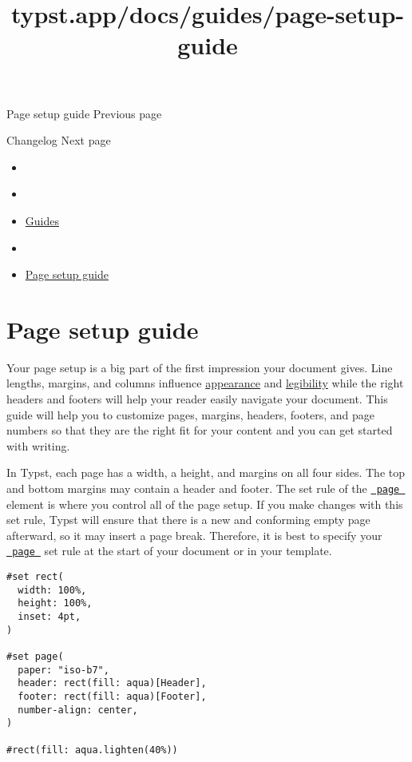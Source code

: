{ Page setup guide } { Previous page }

\href{/docs/changelog/}{\pandocbounded{}}

{ Changelog } { Next page }


\title{typst.app/docs/guides/page-setup-guide}

\begin{itemize}
\tightlist
\item
  \href{/docs}{}
\item
  
\item
  \href{/docs/guides/}{Guides}
\item
  
\item
  \href{/docs/guides/page-setup-guide/}{Page setup guide}
\end{itemize}

\section{Page setup guide}\label{page-setup-guide}

Your page setup is a big part of the first impression your document
gives. Line lengths, margins, and columns influence
\href{https://practicaltypography.com/page-margins.html}{appearance} and
\href{https://designregression.com/article/line-length-revisited-following-the-research}{legibility}
while the right headers and footers will help your reader easily
navigate your document. This guide will help you to customize pages,
margins, headers, footers, and page numbers so that they are the right
fit for your content and you can get started with writing.

In Typst, each page has a width, a height, and margins on all four
sides. The top and bottom margins may contain a header and footer. The
set rule of the \href{/docs/reference/layout/page/}{\texttt{\ page\ }}
element is where you control all of the page setup. If you make changes
with this set rule, Typst will ensure that there is a new and conforming
empty page afterward, so it may insert a page break. Therefore, it is
best to specify your
\href{/docs/reference/layout/page/}{\texttt{\ page\ }} set rule at the
start of your document or in your template.

\begin{verbatim}
#set rect(
  width: 100%,
  height: 100%,
  inset: 4pt,
)

#set page(
  paper: "iso-b7",
  header: rect(fill: aqua)[Header],
  footer: rect(fill: aqua)[Footer],
  number-align: center,
)

#rect(fill: aqua.lighten(40%))
\end{verbatim}

